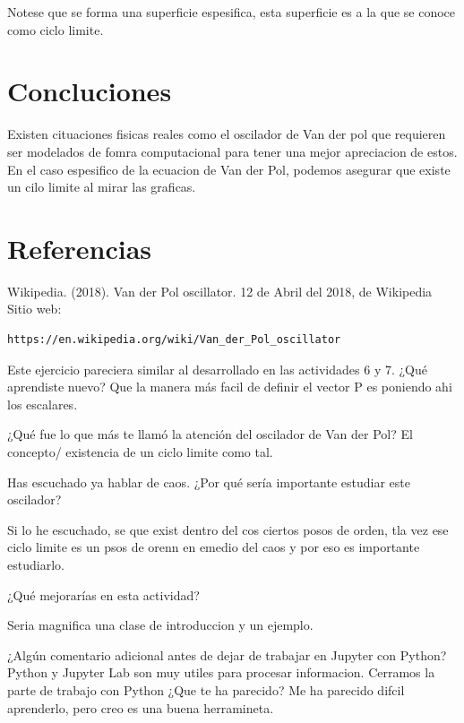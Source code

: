 \documentclass[a4paper]{article}
\begin{document}
\newpage

Notese que se forma una superficie espesifica, esta superficie es a la que se conoce como ciclo limite.

\section{Concluciones}

Existen cituaciones fisicas reales como el oscilador de Van der pol que requieren ser modelados de fomra computacional para tener una mejor apreciacion de estos. En el caso espesifico de la ecuacion de Van der Pol, podemos asegurar que existe un cilo limite al mirar las graficas.

\section{Referencias}

Wikipedia. (2018). Van der Pol oscillator. 12 de Abril del 2018, de Wikipedia Sitio web: 
\begin{verbatim}
https://en.wikipedia.org/wiki/Van_der_Pol_oscillator
\end{verbatim}


    Este ejercicio pareciera similar al desarrollado en las actividades 6 y 7. ¿Qué aprendiste nuevo?
    \linebreak
    Que la manera más facil de definir el vector P es poniendo ahi los escalares.
    \linebreak
    
    ¿Qué fue lo que más te llamó la atención del oscilador de Van der Pol?
    \linebreak
    El concepto/ existencia de un ciclo limite como tal.
    \linebreak
    
    Has escuchado ya hablar de caos. ¿Por qué sería importante estudiar este oscilador?
    \linebreak
    
    Si lo he escuchado, se que exist dentro del cos ciertos posos de orden, tla vez ese ciclo limite es un psos de orenn en emedio del caos y por eso es importante estudiarlo.
    \linebreak
    
    ¿Qué mejorarías en esta actividad?
    \linebreak
    
    Seria magnifica una clase de introduccion y un ejemplo.
    \linebreak
    
    ¿Algún comentario adicional antes de dejar de trabajar en Jupyter con Python?
    \linebreak
    Python y Jupyter Lab son muy utiles para procesar informacion.
    \linebreak
    Cerramos la parte de trabajo con Python ¿Que te ha parecido?
    \linebreak
    Me ha parecido difcil aprenderlo, pero creo es una buena herramineta. 
\end{document}
